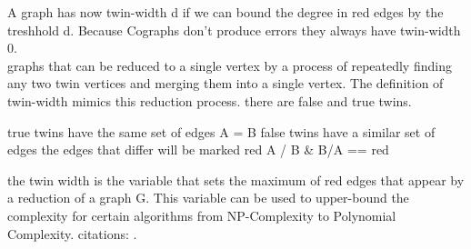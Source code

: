 \documentclass[acmsmall,review]{acmart}
\begin{document}
A graph has now twin-width d if we can bound the degree in red edges by the treshhold d.
Because Cographs don't produce errors they always have twin-width 0. \\

graphs that can be reduced to a single vertex by a process of repeatedly finding any two
twin vertices and merging them into a single vertex. The definition of twin-width mimics
this reduction process. there are false and true twins.

true twins have the same set of edges A = B false twins have a similar set of edges the
edges that differ will be marked red {A / B \& B/A} == red

the twin width is the variable that sets the maximum of red edges that appear by a
reduction of a graph G. This variable can be used to upper-bound the complexity for
certain algorithms from NP-Complexity to Polynomial Complexity. citations:
\cite{bonnet2021twini} \cite{bonnet2021twinii}.



\end{document}
